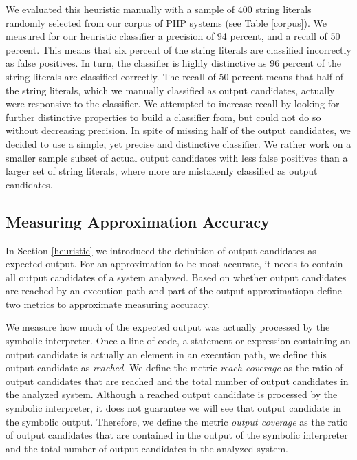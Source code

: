 \documentclass[sigconf]{acmart}
\begin{document}
We evaluated this heuristic manually with a sample of 400 string
literals randomly selected from our corpus of PHP systems (see Table
\ref{corpus}). We measured for our heuristic classifier a precision of 94 percent, and a
recall of 50 percent. This means that six percent of the string literals are
classified incorrectly as false positives. In turn, the classifier is highly
distinctive as 96 percent of the string literals are classified correctly. The
recall of 50 percent means that half of the string literals, which we manually 
classified as output candidates, actually were responsive to the classifier. We
attempted to increase recall by looking for further distinctive properties to build a
classifier from, but could not do so without decreasing precision. 
In spite of missing half of the output candidates, we decided
to use a simple, yet precise and distinctive classifier. We rather work on a
smaller sample subset of actual output candidates with less false positives
than a larger set of string literals, where more are mistakenly classified as
output candidates.

\subsection{Measuring Approximation Accuracy}
\label{HowAccurateIsOurApproximation} 
In Section \ref{heuristic} we introduced the definition of output candidates as
expected output. For an approximation to be most accurate, it needs to contain
all output candidates of a system analyzed. Based on whether output
candidates are reached by an execution path and part of the output
approximatiopn define two metrics to approximate measuring accuracy.

We measure how much of the expected output was actually processed by the
symbolic interpreter.  Once a line of code, a statement or expression
containing an output candidate is actually an element in an execution path, we
define this output candidate as \emph{reached}. We define the metric \emph{reach
coverage} as the ratio of output candidates that are reached and the total
number of output candidates in the analyzed system. Although a reached output
candidate is processed by the symbolic interpreter, it does not guarantee we
will see that output candidate in the symbolic output. Therefore, we define the
metric \emph{output coverage} as the ratio of output candidates that are
contained in the output of the symbolic interpreter and the total number of
output candidates in the analyzed system.  
\end{document}
